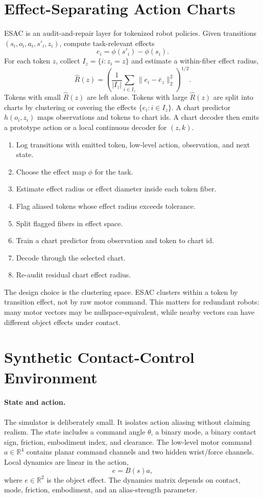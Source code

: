 \documentclass{article}
\begin{document}
\section{Effect-Separating Action Charts}

ESAC is an audit-and-repair layer for tokenized robot policies. Given
transitions $(s_i,o_i,a_i,s'_i,z_i)$, compute task-relevant effects
\[
    e_i=\phi(s'_i)-\phi(s_i).
\]
For each token $z$, collect $I_z=\{i:z_i=z\}$ and estimate a within-fiber
effect radius,
\[
    \widehat R(z)=
    \left(\frac{1}{|I_z|}\sum_{i\in I_z}
    \|e_i-\bar e_z\|_2^2\right)^{1/2}.
\]
Tokens with small $\widehat R(z)$ are left alone. Tokens with large
$\widehat R(z)$ are split into charts by clustering or covering the effects
$\{e_i:i\in I_z\}$. A chart predictor $h(o_i,z_i)$ maps observations and tokens
to chart ids. A chart decoder then emits a prototype action or a local
continuous decoder for $(z,k)$.

\begin{enumerate}[leftmargin=1.4em]
    \item Log transitions with emitted token, low-level action, observation,
    and next state.
    \item Choose the effect map $\phi$ for the task.
    \item Estimate effect radius or effect diameter inside each token fiber.
    \item Flag aliased tokens whose effect radius exceeds tolerance.
    \item Split flagged fibers in effect space.
    \item Train a chart predictor from observation and token to chart id.
    \item Decode through the selected chart.
    \item Re-audit residual chart effect radius.
\end{enumerate}

The design choice is the clustering space. ESAC clusters within a token by
transition effect, not by raw motor command. This matters for redundant robots:
many motor vectors may be nullspace-equivalent, while nearby vectors can have
different object effects under contact.

\section{Synthetic Contact-Control Environment}

\paragraph{State and action.}
The simulator is deliberately small. It isolates action aliasing without
claiming realism. The state includes a command angle $\theta$, a binary mode,
a binary contact sign, friction, embodiment index, and clearance. The low-level
motor command $a\in\mathbb{R}^4$ contains planar command channels and two hidden
wrist/force channels. Local dynamics are linear in the action,
\[
    e = B(s)a,
\]
where $e\in\mathbb{R}^2$ is the object effect. The dynamics matrix depends on
contact, mode, friction, embodiment, and an alias-strength parameter.
\end{document}
